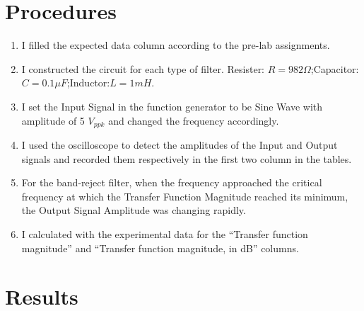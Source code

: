 \documentclass[12pt]{article}
\begin{document}
\section{Procedures}
\begin{enumerate}
\item I filled the expected data column according to the pre-lab assignments.
\item I constructed the circuit for each type of filter. Resister: $R=982\Omega$;Capacitor:$C=0.1\mu F$;Inductor:$L=1mH$.
\item I set the Input Signal in the function generator to be Sine Wave with amplitude of 5 $V_{ppk}$ and changed the frequency accordingly.
\item I used the oscilloscope to detect the amplitudes of the Input and Output signals and recorded them respectively in the first two column in the tables.
\item For the band-reject filter, when the frequency approached the critical frequency at which the Transfer Function Magnitude reached its minimum, the Output Signal Amplitude was changing rapidly.
\item I calculated with the experimental data for the “Transfer function magnitude” and “Transfer function magnitude, in dB” columns.
\end{enumerate}
\section{Results}
\end{document}
